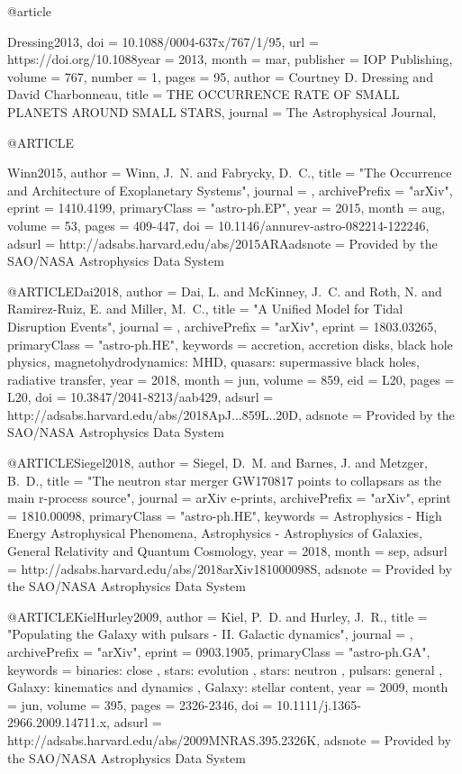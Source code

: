 \documentclass[twocolumn,tighten]{aastex63}
\begin{document}
{@article{Dressing2013,
	doi = {10.1088/0004-637x/767/1/95},
	url = {https://doi.org/10.1088year = 2013,
	month = {mar},
	publisher = {{IOP} Publishing},
	volume = {767},
	number = {1},
	pages = {95},
	author = {Courtney D. Dressing and David Charbonneau},
	title = {{THE} {OCCURRENCE} {RATE} {OF} {SMALL} {PLANETS} {AROUND} {SMALL} {STARS}},
	journal = {The Astrophysical Journal},
}

@ARTICLE{Winn2015,
   author = {{Winn}, J.~N. and {Fabrycky}, D.~C.},
    title = "{The Occurrence and Architecture of Exoplanetary Systems}",
  journal = {\araa},
archivePrefix = "arXiv",
   eprint = {1410.4199},
 primaryClass = "astro-ph.EP",
     year = 2015,
    month = aug,
   volume = 53,
    pages = {409-447},
      doi = {10.1146/annurev-astro-082214-122246},
   adsurl = {http://adsabs.harvard.edu/abs/2015ARAadsnote = {Provided by the SAO/NASA Astrophysics Data System}
}

@ARTICLE{Dai2018,
   author = {{Dai}, L. and {McKinney}, J.~C. and {Roth}, N. and {Ramirez-Ruiz}, E. and 
	{Miller}, M.~C.},
    title = "{A Unified Model for Tidal Disruption Events}",
  journal = {\apjl},
archivePrefix = "arXiv",
   eprint = {1803.03265},
 primaryClass = "astro-ph.HE",
 keywords = {accretion, accretion disks, black hole physics, magnetohydrodynamics: MHD, quasars: supermassive black holes, radiative transfer},
     year = 2018,
    month = jun,
   volume = 859,
      eid = {L20},
    pages = {L20},
      doi = {10.3847/2041-8213/aab429},
   adsurl = {http://adsabs.harvard.edu/abs/2018ApJ...859L..20D},
  adsnote = {Provided by the SAO/NASA Astrophysics Data System}
}

@ARTICLE{Siegel2018,
   author = {{Siegel}, D.~M. and {Barnes}, J. and {Metzger}, B.~D.},
    title = "{The neutron star merger GW170817 points to collapsars as the main r-process source}",
  journal = {arXiv e-prints},
archivePrefix = "arXiv",
   eprint = {1810.00098},
 primaryClass = "astro-ph.HE",
 keywords = {Astrophysics - High Energy Astrophysical Phenomena, Astrophysics - Astrophysics of Galaxies, General Relativity and Quantum Cosmology},
     year = 2018,
    month = sep,
   adsurl = {http://adsabs.harvard.edu/abs/2018arXiv181000098S},
  adsnote = {Provided by the SAO/NASA Astrophysics Data System}
}

@ARTICLE{KielHurley2009,
   author = {{Kiel}, P.~D. and {Hurley}, J.~R.},
    title = "{Populating the Galaxy with pulsars - II. Galactic dynamics}",
  journal = {\mnras},
archivePrefix = "arXiv",
   eprint = {0903.1905},
 primaryClass = "astro-ph.GA",
 keywords = {binaries: close , stars: evolution , stars: neutron , pulsars: general , Galaxy: kinematics and dynamics , Galaxy: stellar content},
     year = 2009,
    month = jun,
   volume = 395,
    pages = {2326-2346},
      doi = {10.1111/j.1365-2966.2009.14711.x},
   adsurl = {http://adsabs.harvard.edu/abs/2009MNRAS.395.2326K},
  adsnote = {Provided by the SAO/NASA Astrophysics Data System}
}

}}}
\end{document}
